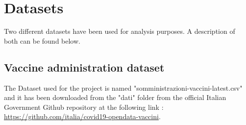 \documentclass{article}
\begin{document}

\hfill\break
\newpage

\newpage
\section{Datasets}
Two different datasets have been used for analysis purposes. A description of both can be found below.
\subsection{Vaccine administration dataset}
The Dataset used for the project is named {\selectfont"somministrazioni-vaccini-latest.csv"} and it has been downloaded from the {\selectfont"dati"} folder from the official Italian Government Github repository at the following link :\\ \url{https://github.com/italia/covid19-opendata-vaccini}.
\end{document}

